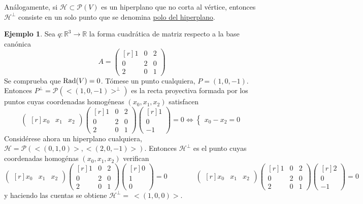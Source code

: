 \documentclass[12pt]{report}
\theoremstyle{definition}
\theoremstyle{definition}
\newtheorem{example}{Ejemplo}[chapter]
\theoremstyle{remark}
\newcommand{\R}{\mathbb R}
\begin{document}
\vspace{2mm}
Análogamente, si $\mathcal{H} \subset \mathcal{P}(V)$ es un hiperplano que no corta al vértice, entonces $\mathcal{H}^\perp$ consiste en un solo punto que se denomina \ul{polo del hiperplano}.

\begin{example}
Sea $q \colon \R^3 \to \R$ la forma cuadrática de matriz respecto a la base canónica
\[A = \begin{pmatrix*}[r]
    1 & 0 & 2 \\
    0 & 2 & 0 \\
    2 & 0 & 1
\end{pmatrix*}\]
Se comprueba que $\textup{Rad}(V) = 0$. Tómese un punto cualquiera, $P = (1,0,-1)$. Entonces $P^\perp = \mathcal{P}(<(1,0,-1)>^\perp)$ es la recta proyectiva formada por los puntos cuyas coordenadas homogéneas $(x_0,x_1,x_2)$ satisfacen
\[\begin{pmatrix*}[r]
    x_0 & x_1 & x_2
\end{pmatrix*}\begin{pmatrix*}[r]
    1 & 0 & 2 \\
    0 & 2 & 0 \\
    2 & 0 & 1
\end{pmatrix*} \begin{pmatrix*}[r]
    1 \\
    0 \\
    -1
\end{pmatrix*} = 0 \iff \begin{cases}
    x_0-x_2 = 0
\end{cases}\]
Considérese ahora un hiperplano cualquiera, $\mathcal{H} = \mathcal{P}(<(0,1,0)>,<(2,0,-1)>)$. Entonces $\mathcal{H}^\perp$ es el punto cuyas coordenadas homogénas $(x_0,x_1,x_2)$ verifican
\[\begin{pmatrix*}[r]
    x_0 & x_1 & x_2
\end{pmatrix*}\begin{pmatrix*}[r]
    1 & 0 & 2 \\
    0 & 2 & 0 \\
    2 & 0 & 1
\end{pmatrix*} \begin{pmatrix*}[r]
    0 \\
    1 \\
    0
\end{pmatrix*} = 0 \qquad \qquad \begin{pmatrix*}[r]
    x_0 & x_1 & x_2
\end{pmatrix*}\begin{pmatrix*}[r]
    1 & 0 & 2 \\
    0 & 2 & 0 \\
    2 & 0 & 1
\end{pmatrix*} \begin{pmatrix*}[r]
    2 \\
    0 \\
    -1
\end{pmatrix*} = 0 \]
y haciendo las cuentas se obtiene $\mathcal{H}^\perp = \ <(1,0,0)>$.
\end{example}
\end{document}
